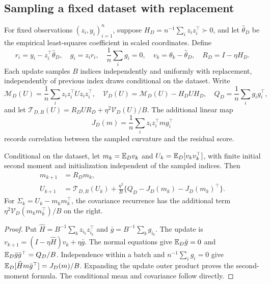 \subsection{Sampling a fixed dataset with replacement}

For fixed observations $(z_i,y_i)_{i=1}^n$, suppose
$H_D = n^{-1}\sum_i z_i z_i^\top \succ 0$, and let $\widehat\theta_D$ be the
empirical least-squares coefficient in scaled coordinates. Define
\[
 r_i = y_i - z_i^\top\widehat\theta_D,\quad g_i
     = z_i r_i,\quad \frac1n\sum_i g_i
     = 0,\quad v_k
     = \theta_k - \widehat\theta_D,\quad R_D
     = I - \eta H_D.
\]
Each update samples $B$ indices independently and uniformly with replacement,
independently of previous index draws conditional on the dataset. Write
\[
 \mathcal M_D(U) = \frac1n\sum_i z_i z_i^\top U z_i z_i^\top,\quad \mathcal V_D(U)
                 = \mathcal M_D(U) - H_DUH_D,\quad Q_D
                 = \frac1n\sum_i g_i g_i^\top,
\]
and let $\mathcal T_{D,B}(U) = R_DUR_D + \eta^2\mathcal V_D(U)/B$. The
additional linear map
\[
 J_D(m) = \frac1n\sum_i z_i z_i^\top m g_i^\top
\]
records correlation between the sampled curvature and the residual score.

\begin{proposition}
 \label{prop:replacement}
 Conditional on the dataset, let $m_k = \mathbb{E}_Dv_k$ and $U_k = \mathbb{E}_D[v_kv_k^\top]$,
 with finite initial second moment and initialization independent of the sampled
 indices. Then
 \begin{align*}
  m_{k+1} & = R_Dm_k,                                                                     \\
  U_{k+1} & = \mathcal T_{D,B}(U_k) + \frac{\eta^2}{B}\{Q_D - J_D(m_k) - J_D(m_k)^\top\}.
 \end{align*}
 For $\Sigma_k = U_k - m_km_k^\top$, the covariance recurrence has the
 additional term $\eta^2\mathcal V_D(m_km_k^\top)/B$ on the right.
\end{proposition}
\begin{proof}
 Put $\widehat H = B^{-1}\sum_b z_{i_b}z_{i_b}^\top$ and
 $\bar g = B^{-1}\sum_b g_{i_b}$. The update is
 $v_{k+1} = (I - \eta\widehat H)v_k + \eta\bar g$. The normal equations give
 $\mathbb{E}_D\bar g = 0$ and $\mathbb{E}_D\bar g\bar g^\top = Q_D/B$. Independence within a
 batch and $n^{-1}\sum_i g_i = 0$ give
 $\mathbb{E}_D[\widehat Hm\bar g^\top] = J_D(m)/B$. Expanding the update outer product
 proves the second-moment formula. The conditional mean and covariance follow
 directly.
\end{proof}

